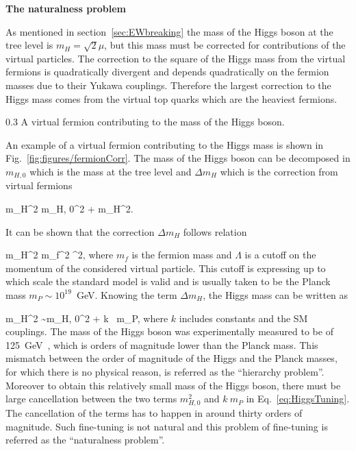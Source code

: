 \textbf{The naturalness problem}

As mentioned in section~\ref{sec:EWbreaking} the mass of the Higgs boson at the tree level is $m_{H} = \sqrt{2}\mu$, but this mass must be corrected for contributions of the virtual particles. The correction to the square of the Higgs mass from the virtual fermions is quadratically divergent and depends quadratically on the fermion masses due to their Yukawa couplings. Therefore the largest correction to the Higgs mass comes from the virtual top quarks which are the heaviest fermions.

                 {0.3}       %
                 { A virtual fermion contributing to the mass of the Higgs boson. }

An example of a virtual fermion contributing to the Higgs mass is shown in Fig.~\ref{fig:figures/fermionCorr}. The mass of the Higgs boson can be decomposed in $m_{H,0}$ which is the mass at the tree level and $\Delta m_{H}$ which is the correction from virtual fermions

{
m_{H}^{2} \approx m_{H, 0}^{2} + \Delta m_{H}^{2}.
}

It can be shown that the correction $\Delta m_{H}$ follows relation

{
\Delta m_{H}^{2} \propto m_{f}^{2} \Lambda^2,
}
where $m_f$ is the fermion mass and $\Lambda$ is a cutoff on the momentum of the considered virtual particle. This cutoff is expressing up to which scale the standard model is valid and is usually taken to be the Planck mass $m_{P} \sim  10^{19}$~GeV. Knowing the term $\Delta m_{H}$, the Higgs mass can be written as

{
m_{H}^{2} \sim m_{H, 0}^{2} + k ~m_{P},
}
where $k$ includes constants and the SM couplings. The mass of the Higgs boson was experimentally measured to be of 125~GeV~\cite{Chatrchyan:2012xdj, Aad:2012tfa}, which is orders of magnitude lower than the Planck mass. This mismatch between the order of magnitude of the Higgs and the Planck masses, for which there is no physical reason, is referred as the ``hierarchy problem''. Moreover to obtain this relatively small mass of the Higgs boson, there must be large cancellation between the two terms $m_{H, 0}^{2}$ and $k ~m_{P}$  in Eq.~\ref{eq:HiggsTuning}. The cancellation of the terms has to happen in around thirty orders of magnitude. Such fine-tuning is not natural and this problem of fine-tuning is referred as the ``naturalness problem''.

